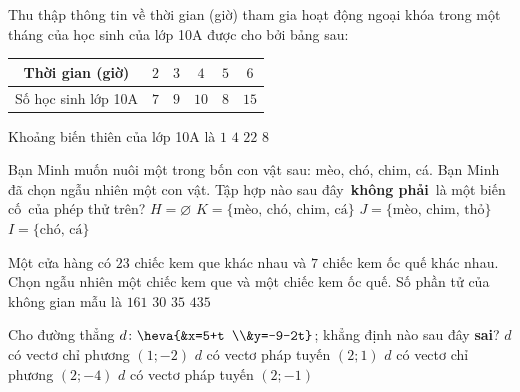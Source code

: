 \begin{ex}%
Thu thập thông tin về thời gian (giờ) tham gia hoạt động ngoại khóa trong một tháng của học sinh của lớp 10A được cho bởi bảng sau:
\begin{center}
\begin{tabular}{|c|c|c|c|c|c|}
\hline Thời gian (giờ) & $2$ & $3$ & $4$ & $5$ & $6$ \\
\hline Số học sinh lớp 10A & $7$ & $9$ & $10$ & $8$ & $15$ \\
\hline
\end{tabular}
\end{center}
Khoảng biến thiên của lớp 10A là
\choice
{$1$}
{\True $4$}
{$22$}
{$8$}
\end{ex}

\begin{ex}%
Bạn Minh muốn nuôi một trong bốn con vật sau: mèo, chó, chim, cá. Bạn Minh đã chọn ngẫu nhiên một con vật. Tập hợp nào sau đây \textbf{không phải} là một biến cố của phép thử trên?
\choice
{$H=\varnothing $}
{$K= \{ \text{mèo, chó, chim, cá}\}$}
{\True $J= \{ \text{mèo, chim, thỏ}\}$}
{$I= \{ \text{chó, cá}\}$}
\end{ex}

\begin{ex}%
Một cửa hàng có $23$ chiếc kem que khác nhau và $7$ chiếc kem ốc quế khác nhau. Chọn ngẫu nhiên một chiếc kem que và một chiếc kem ốc quế. Số phần tử của không gian mẫu là
\choice
{\True $161$}
{$30$}
{$35$}
{$435$}
\end{ex}

\begin{ex}%
Cho đường thẳng $d \colon \heva{&x=5+t \\&y=-9-2t}$; khẳng định nào sau đây \textbf{sai}?
\choice
{$d$ có vectơ chỉ phương $(1;-2)$}
{$d$ có vectơ pháp tuyến $(2;1)$}
{$d$ có vectơ chỉ phương $(2;-4)$}
{\True $d$ có vectơ pháp tuyến $(2;-1)$}
\end{ex}

